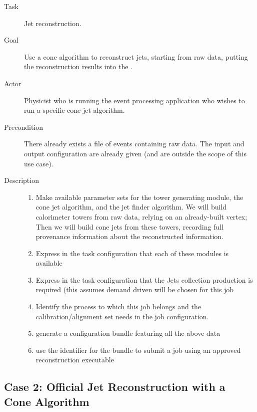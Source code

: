 \documentclass[draftmode]{memarticle}
\newcommand{\Event}{\classname{Event}}
\begin{document}
\begin{description}

\item[Task]

Jet reconstruction.

\item[Goal]

Use a cone algorithm to reconstruct jets,
starting from raw data,
putting the reconstruction results into the \Event.

\item[Actor]

Physicist who is running the event processing application
who wishes to run a specific cone jet algorithm.

\item[Precondition]

There already exists a file of events containing raw data.
The input and output configuration are already given
(and are outside the scope of this use case).

\item[Description]

\begin{enumerate}
  \item Make available parameter sets for the tower generating module,
        the cone jet algorithm, and the jet finder algorithm.
        We will build calorimeter towers from raw data,
        relying on an already-built vertex;
        Then we will build cone jets from these towers,
        recording full provenance information
        about the reconstructed information.
  \item Express in the task configuration that each of these modules
        is available
  \item Express in the task configuration that the Jets collection
        production is required
        (this assumes demand driven will be chosen for this job
  \item Identify the process to which this job belongs and the
        calibration/alignment set needs in the job configuration.
  \item generate a configuration bundle featuring all the above
        data
  \item use the identifier for the bundle to submit a job using
        an approved reconstruction executable
\end{enumerate}

\end{description}

\subsection{Case 2: Official Jet Reconstruction with a Cone Algorithm}
\end{document}
